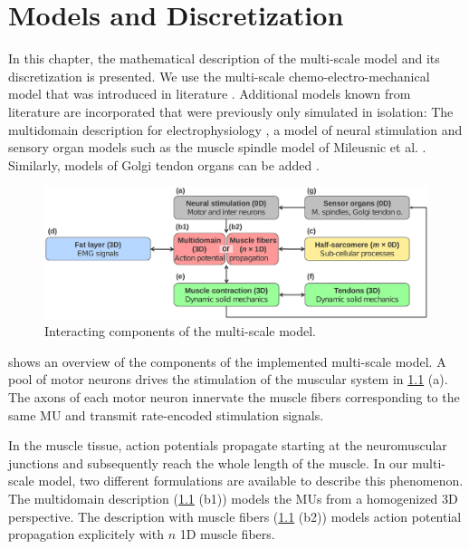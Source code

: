 \chapter{Models and Discretization}

In this chapter, the mathematical description of the multi-scale model and its discretization is presented. 
We use the multi-scale chemo-electro-mechanical model that was introduced in literature \cite{Roehrle2012,Heidlauf2013,Heidlauf2015Diss,Mordhorst2015}. Additional models known from literature are incorporated that  were previously only simulated in isolation: The multidomain description for electrophysiology \cite{Klotz2020}, a model of neural stimulation \cite{Cisi2008} and sensory organ models such as the muscle spindle model of Mileusnic et al. \cite{Mileusnic2006Spindle}. Similarly, models of Golgi tendon organs can be added \cite{Mileusnic2006Golgi}.

\begin{figure}%
  \centering%
  \includegraphics[width=\textwidth]{images/theory/model_schematic.pdf}%
  \caption{Interacting components of the multi-scale model.}%
  \label{fig:multi-scale-model}%
\end{figure}

 shows an overview of the components of the implemented multi-scale model.
A pool of motor neurons drives the stimulation of the muscular system in \cref{fig:multi-scale-model} (a). 
The axons of each motor neuron innervate the muscle fibers corresponding to the same MU and transmit rate-encoded stimulation signals.

In the muscle tissue, action potentials propagate starting at the neuromuscular junctions and subsequently reach the whole length of the muscle.
In our multi-scale model, two different formulations are available to describe this phenomenon. The multidomain description (\cref{fig:multi-scale-model} (b1)) models the MUs from a  homogenized 3D perspective. The description with muscle fibers (\cref{fig:multi-scale-model} (b2)) models action potential propagation explicitely with $n$ 1D muscle fibers. 

